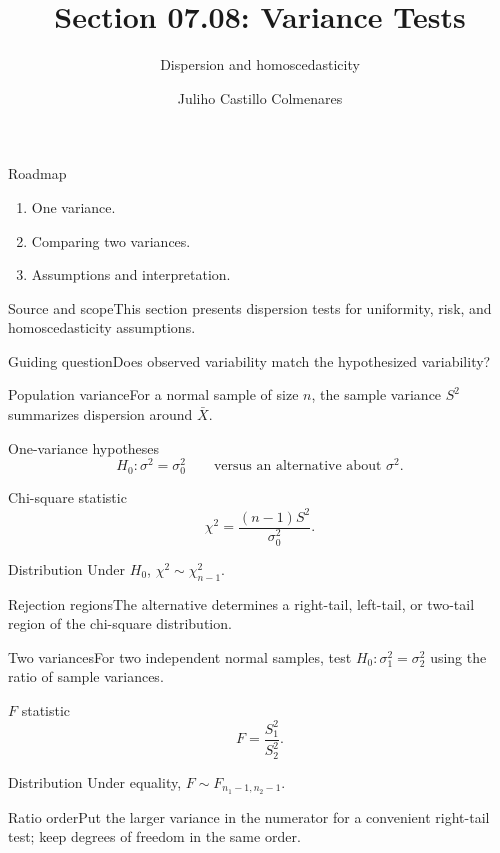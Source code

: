 \documentclass[10pt,aspectratio=169]{beamer}
\title[Variance tests]{Section 07.08: Variance Tests}\subtitle{Dispersion and homoscedasticity}
\author[J. Castillo Colmenares]{Juliho Castillo Colmenares}\institute{Tecnológico de Monterrey}\date{}
\begin{document}
\begin{frame}[plain]\titlepage\end{frame}
\begin{frame}{Roadmap}\small\begin{enumerate}\item One variance.\item Comparing two variances.\item Assumptions and interpretation.\end{enumerate}\end{frame}
\begin{frame}{Source and scope}\small This section presents dispersion tests for uniformity, risk, and homoscedasticity assumptions.\begin{block}{Guiding question}Does observed variability match the hypothesized variability?\end{block}\end{frame}
\begin{frame}{Population variance}\small For a normal sample of size $n$, the sample variance $S^2$ summarizes dispersion around $\bar X$.\end{frame}
\begin{frame}{One-variance hypotheses}\small\[H_0:\sigma^2=\sigma_0^2\qquad\text{versus an alternative about }\sigma^2.\]\end{frame}
\begin{frame}{Chi-square statistic}\small\[\chi^2=\frac{(n-1)S^2}{\sigma_0^2}.\]\begin{block}{Distribution} Under $H_0$, $\chi^2\sim\chi^2_{n-1}$.\end{block}\end{frame}
\begin{frame}{Rejection regions}\small The alternative determines a right-tail, left-tail, or two-tail region of the chi-square distribution.\end{frame}
\begin{frame}{Two variances}\small For two independent normal samples, test $H_0:\sigma_1^2=\sigma_2^2$ using the ratio of sample variances.\end{frame}
\begin{frame}{$F$ statistic}\small\[F=\frac{S_1^2}{S_2^2}.\]\begin{block}{Distribution} Under equality, $F\sim F_{n_1-1,n_2-1}$.\end{block}\end{frame}
\begin{frame}{Ratio order}\small Put the larger variance in the numerator for a convenient right-tail test; keep degrees of freedom in the same order.\end{frame}
\end{document}
